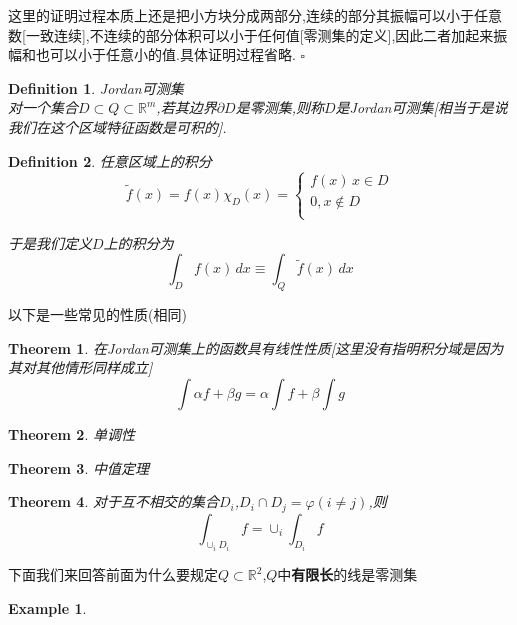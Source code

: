 \documentclass[11pt,hyperref,a4paper,UTF8]{ctexart}
\newtheorem{theorem}{Theorem}[subsection]
\newtheorem{example}{Example}[subsection]
\newtheorem{definition}{Definition}[subsection]
\newenvironment{cproof}{%
\heiti{证明}\kaishu
}{%
  \hfill $\square$
  \par\bigskip
}
\newcommand{\RR}{\mathbb{R}}
\begin{document}
\begin{CJK}{UTF8}{gkai}
\begin{cproof}
  这里的证明过程本质上还是把小方块分成两部分,连续的部分其振幅可以小于任意数[一致连续],不连续的部分体积可以小于任何值[零测集的定义],因此二者加起来振幅和也可以小于任意小的值.具体证明过程省略.
\end{cproof}

\begin{definition}
  Jordan可测集\\

  对一个集合$D \subset Q \subset \RR^m$,若其边界$\partial D$是零测集,则称$D$是Jordan可测集[相当于是说我们在这个区域特征函数是可积的].
\end{definition}

\begin{definition}
  任意区域上的积分\\


  \[\tilde{f}(x) = f(x) \chi_D(x) = \begin{cases}
    f(x)\, x \in D\\
    0, x \notin D\\
\end{cases}\]

于是我们定义$D$上的积分为
\[\int_{D} f(x)\, dx \equiv \int_{Q} \tilde{f}(x)\, dx\]
\end{definition}

以下是一些常见的性质(相同)\\

\begin{theorem}
  在Jordan可测集上的函数具有线性性质[这里没有指明积分域是因为其对其他情形同样成立]
  \[\int \alpha f + \beta g = \alpha \int f + \beta \int g\]
\end{theorem}

\begin{theorem}
  单调性
\end{theorem}

\begin{theorem}
  中值定理\\
\end{theorem}

\begin{theorem}
  对于互不相交的集合$D_i$,$D_i \cap D_j = \varphi(i \neq j)$,则
  \[\int_{\cup_i D_i} f = \cup_i \int_{D_i} f\]
\end{theorem}

下面我们来回答前面为什么要规定$Q \subset \RR^2$,$Q$中\textbf{有限长}的线是零测集

\begin{example}
  

\end{example}
\end{CJK}
\end{document}
